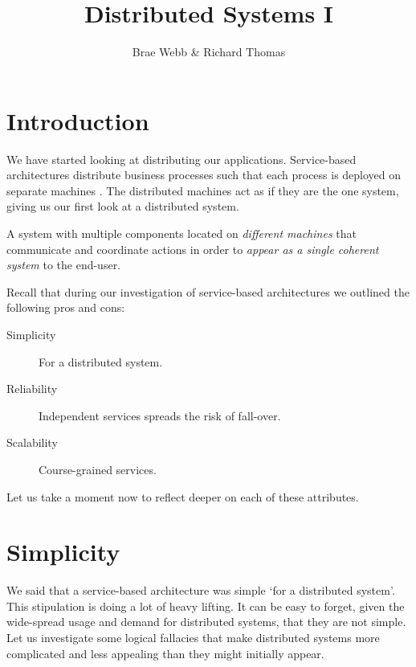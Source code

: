 \title{Distributed Systems I}
\author{Brae Webb \& Richard Thomas}

\maketitle

\section{Introduction}
We have started looking at distributing our applications.
Service-based architectures distribute business processes such that each process is deployed on separate machines \cite{service-based-notes}.
The distributed machines act as if they are the one system,
giving us our first look at a distributed system.

\begin{definition}
A system with multiple components located on \textsl{different machines} that communicate and coordinate actions in order to \textsl{appear as a single coherent system} to the end-user.
\end{definition}

\noindent Recall that during our investigation of service-based architectures we outlined the following pros and cons:
\begin{description}
    \item[Simplicity] For a distributed system.
    \item[Reliability] Independent services spreads the risk of fall-over.
    \item[Scalability] Course-grained services.
\end{description}

\noindent Let us take a moment now to reflect deeper on each of these attributes.

\section{Simplicity}
We said that a service-based architecture was simple `for a distributed system'.
This stipulation is doing a lot of heavy lifting.
It can be easy to forget, given the wide-spread usage and demand for distributed systems, that they are not simple.
%
Let us investigate some logical fallacies that make distributed systems more complicated and less appealing than they might initially appear.

